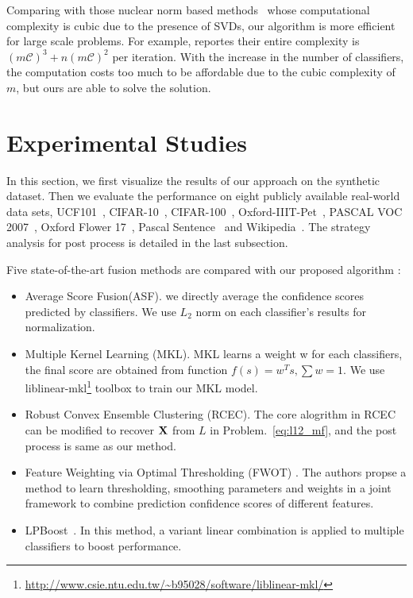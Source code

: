 \documentclass[10pt,twocolumn,letterpaper]{article}
\def\calC{{\mathcal{C}}}
\def\bX{{\bf X}}
\def\bX{{\bf X}}
\begin{document}
Comparing with those nuclear norm based methods~\cite{gaoijcai2016robust,ye2012robust} whose computational complexity is cubic due to the presence of SVDs,
our algorithm is more efficient for large scale problems.
For example, \cite{gaoijcai2016robust} reportes their entire complexity is $(m{\calC})^3+n(m{\calC})^2$ per iteration.
With the increase in the number of classifiers,
the computation costs too much to be affordable due to the cubic complexity of $m$,
but ours are able to solve the solution.

\section{Experimental Studies}

In this section, we first visualize the results of our approach on the synthetic dataset.
Then we evaluate the performance on eight publicly available real-world data sets,
UCF101~\cite{soomro2012ucf101}, CIFAR-10~\cite{krizhevsky2009learning}, CIFAR-100~\cite{krizhevsky2009learning}, Oxford-IIIT-Pet~\cite{parkhi2012cats}, PASCAL VOC 2007~\cite{pascal-voc-2007}, Oxford Flower 17~\cite{nilsback2006visual}, Pascal Sentence~\cite{rashtchian2010collecting} and Wikipedia~\cite{rasiwasia2010new}.
The strategy analysis for post process is detailed in the last subsection.


Five state-of-the-art fusion methods are compared with our proposed algorithm :
\begin{itemize}
\item Average Score Fusion(ASF). we directly average the confidence scores predicted by classifiers. We use $L_2$ norm on each classifier's results for normalization.
\item Multiple Kernel Learning (MKL).  MKL learns a weight w for each classifiers, the final score are obtained from function $f(s)=w^{T}s, \sum w = 1$. We use liblinear-mkl\footnote{\url{http://www.csie.ntu.edu.tw/~b95028/software/liblinear-mkl/}} toolbox to train our MKL model.
\item Robust Convex Ensemble Clustering (RCEC)\cite{gaoijcai2016robust}.
The core alogrithm in RCEC can be modified to recover $\bX$ from $L$ in Problem.~\ref{eq:l12_mf}, and the post process is same as our method.
\item Feature Weighting via Optimal Thresholding (FWOT) \cite{xuiccv2013feature}.
The authors propse a method to learn thresholding, smoothing parameters and weights in a joint framework to combine prediction confidence scores of different features.
\item LPBoost~\cite{gehler2009feature}. In this method, a variant linear combination is applied to multiple classifiers to boost performance.
\end{itemize}
\end{document}
